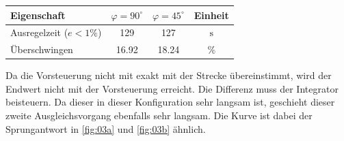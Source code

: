 \begin{table}[h!]
	\centering
	\begin{tabular}{l c c c}
		Eigenschaft
			& $\varphi = 90^\circ$
			& $\varphi = 45^\circ$ 
			& Einheit\\
		\hline
		Ausregelzeit ($e < 1\%$)
			& 129
			& 127
            & $\si{\second}$ \\
		Überschwingen
			& 16.92
			& 18.24
			& $\%$
	\end{tabular}
\end{table}
Da die Vorsteuerung nicht mit exakt mit der Strecke übereinstimmt, 
wird der Endwert nicht mit der Vorsteuerung erreicht. Die Differenz muss
der Integrator beisteuern. Da dieser in dieser Konfiguration sehr langsam 
ist, geschieht dieser zweite Ausgleichsvorgang ebenfalls sehr langsam. Die 
Kurve ist dabei der Sprungantwort in \autoref{fig:03a} und \autoref{fig:03b}
ähnlich. 
